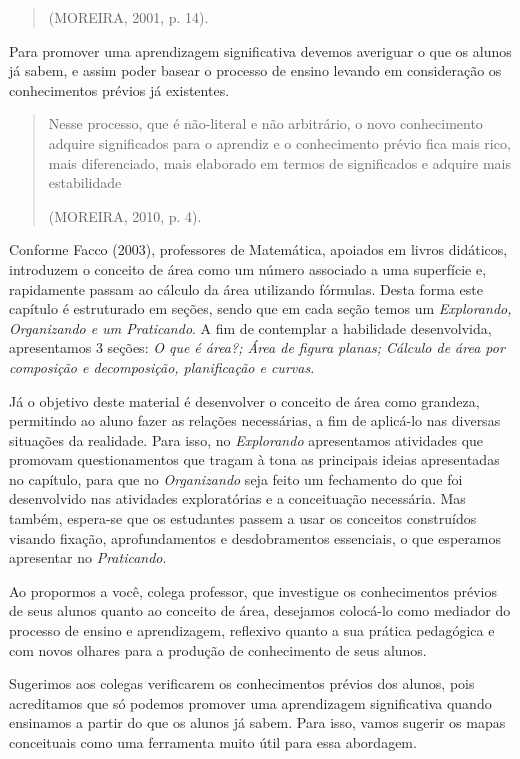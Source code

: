 \begin{apresentacao}
\begin{quote}
  \flushright
  (MOREIRA, 2001, p. 14).
  \end{quote}

  Para promover uma aprendizagem significativa devemos averiguar o que os alunos já sabem, e assim poder basear o processo de ensino levando em consideração os conhecimentos prévios já existentes.
  \begin{quote}
  Nesse processo, que é não-literal e não arbitrário, o novo conhecimento adquire significados para o aprendiz e o conhecimento prévio fica mais rico, mais diferenciado, mais elaborado em termos de significados e adquire mais estabilidade 

  \flushright
  (MOREIRA, 2010, p. 4).
  \end{quote}

  Conforme Facco (2003), professores de Matemática, apoiados em livros didáticos, introduzem o conceito de área como um número associado a uma superfície e, rapidamente passam ao cálculo da área utilizando fórmulas. Desta forma este capítulo é estruturado em seções, sendo que em cada seção temos um \textit{Explorando, Organizando e um Praticando}. A fim de contemplar a habilidade desenvolvida, apresentamos 3 seções: \textit{O que é área?; Área de figura planas; Cálculo de área por composição e decomposição, planificação e curvas. }

  Já o objetivo deste material é desenvolver o conceito de área como grandeza, permitindo ao aluno fazer as relações necessárias, a fim de aplicá-lo nas diversas situações da realidade. Para isso, no \textit{Explorando} apresentamos atividades que promovam questionamentos que tragam à tona as principais ideias apresentadas no capítulo, para que no \textit{Organizando} seja feito um fechamento do que foi desenvolvido nas atividades exploratórias e a conceituação necessária. Mas também, espera-se que os estudantes passem a usar os conceitos construídos visando fixação, aprofundamentos e desdobramentos essenciais, o que esperamos apresentar no \textit{Praticando}.

  Ao propormos a você, colega professor, que investigue os conhecimentos prévios de seus alunos quanto ao conceito de área, desejamos colocá-lo como mediador do processo de ensino e aprendizagem, reflexivo quanto a sua prática pedagógica e com novos olhares para a produção de conhecimento de seus alunos.

  Sugerimos aos colegas verificarem os conhecimentos prévios dos alunos, pois acreditamos que só podemos promover uma aprendizagem significativa quando ensinamos a partir do que os alunos já sabem. Para isso, vamos sugerir os mapas conceituais como uma ferramenta muito útil para essa abordagem. 


\end{apresentacao}
